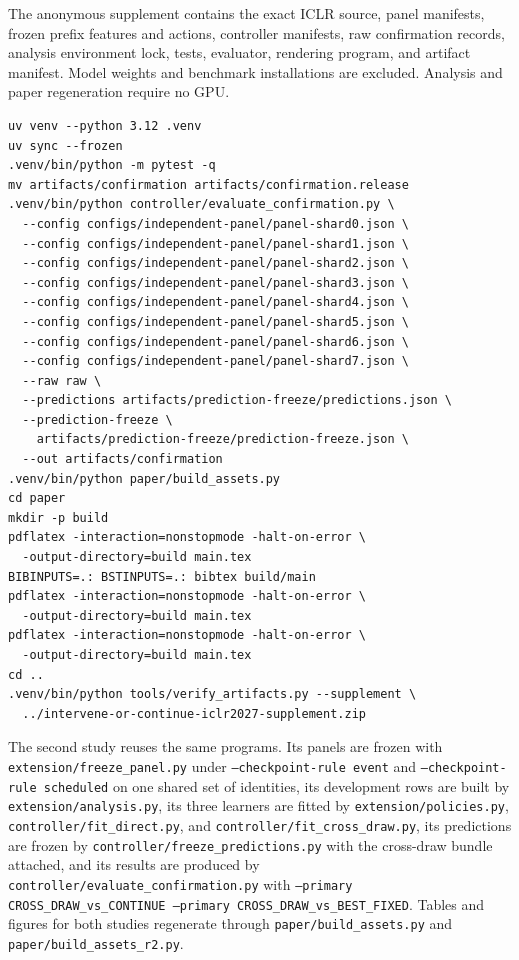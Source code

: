 The anonymous supplement contains the exact ICLR source, panel manifests, frozen prefix features and actions, controller manifests, raw confirmation records, analysis environment lock, tests, evaluator, rendering program, and artifact manifest. Model weights and benchmark installations are excluded. Analysis and paper regeneration require no GPU.

\begin{verbatim}
uv venv --python 3.12 .venv
uv sync --frozen
.venv/bin/python -m pytest -q
mv artifacts/confirmation artifacts/confirmation.release
.venv/bin/python controller/evaluate_confirmation.py \
  --config configs/independent-panel/panel-shard0.json \
  --config configs/independent-panel/panel-shard1.json \
  --config configs/independent-panel/panel-shard2.json \
  --config configs/independent-panel/panel-shard3.json \
  --config configs/independent-panel/panel-shard4.json \
  --config configs/independent-panel/panel-shard5.json \
  --config configs/independent-panel/panel-shard6.json \
  --config configs/independent-panel/panel-shard7.json \
  --raw raw \
  --predictions artifacts/prediction-freeze/predictions.json \
  --prediction-freeze \
    artifacts/prediction-freeze/prediction-freeze.json \
  --out artifacts/confirmation
.venv/bin/python paper/build_assets.py
cd paper
mkdir -p build
pdflatex -interaction=nonstopmode -halt-on-error \
  -output-directory=build main.tex
BIBINPUTS=.: BSTINPUTS=.: bibtex build/main
pdflatex -interaction=nonstopmode -halt-on-error \
  -output-directory=build main.tex
pdflatex -interaction=nonstopmode -halt-on-error \
  -output-directory=build main.tex
cd ..
.venv/bin/python tools/verify_artifacts.py --supplement \
  ../intervene-or-continue-iclr2027-supplement.zip
\end{verbatim}

The second study reuses the same programs. Its panels are frozen with \texttt{extension/freeze\_panel.py} under \texttt{--checkpoint-rule event} and \texttt{--checkpoint-rule scheduled} on one shared set of identities, its development rows are built by \texttt{extension/analysis.py}, its three learners are fitted by \texttt{extension/policies.py}, \texttt{controller/fit\_direct.py}, and \texttt{controller/fit\_cross\_draw.py}, its predictions are frozen by \texttt{controller/freeze\_predictions.py} with the cross-draw bundle attached, and its results are produced by \texttt{controller/evaluate\_confirmation.py} with \texttt{--primary CROSS\_DRAW\_vs\_CONTINUE --primary CROSS\_DRAW\_vs\_BEST\_FIXED}. Tables and figures for both studies regenerate through \texttt{paper/build\_assets.py} and \texttt{paper/build\_assets\_r2.py}.

